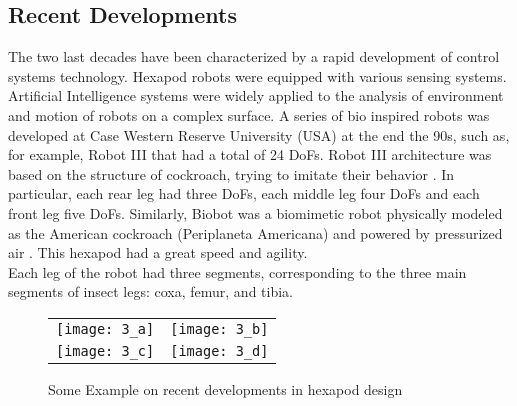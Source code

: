 \subsection{Recent Developments}
The two last decades have been characterized by a rapid development of control systems technology. Hexapod robots were equipped with various sensing systems. Artificial Intelligence systems were widely applied to the analysis of environment and motion of robots on a complex surface. A series of bio inspired robots was developed at Case Western Reserve University (USA) at the end the 90s, such as, for example, Robot III that had a total of 24 DoFs. Robot III architecture was based on the structure of cockroach, trying to imitate their behavior \cite{25h}. In particular, each rear leg had three DoFs, each middle leg four DoFs and each front leg five DoFs. Similarly, Biobot was a biomimetic robot physically modeled as the American cockroach (Periplaneta Americana) and powered by pressurized air \cite{26h}. This hexapod had a great speed and agility. \\
Each leg of the robot had three segments, corresponding to the three main segments of insect legs: coxa, femur, and tibia.
\begin{figure}[h]
    \centering
    \begin{tabular}{ l l }
        \texttt{[image: 3\_a]} & 
        \texttt{[image: 3\_b]} \\ 
        \texttt{[image: 3\_c]} & 
        \texttt{[image: 3\_d]} \\ 
    \end{tabular}
    \caption{Some Example on recent developments in hexapod design}
    \label{fig3}
\end{figure}

